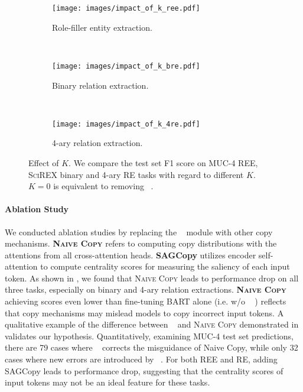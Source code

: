\documentclass[11pt]{article}
\begin{document}
\begin{figure*}[t]
    \centering
    \begin{subfigure}[t]{0.31\textwidth}

    \texttt{[image: images/impact\_of\_k\_ree.pdf]}
    \caption{Role-filler entity extraction.}
    \end{subfigure}
    ~
    \begin{subfigure}[t]{0.31\textwidth}
    \texttt{[image: images/impact\_of\_k\_bre.pdf]}
    \caption{Binary relation extraction.}
    \end{subfigure}
    ~
    \begin{subfigure}[t]{0.31\textwidth}
    \texttt{[image: images/impact\_of\_k\_4re.pdf]}
    \caption{4-ary relation extraction.}
    \end{subfigure}
    
    \caption{Effect of $K$. We compare the test set F1 score on MUC-4 REE, \textsc{SciREX} binary and 4-ary RE tasks with regard to different $K$. $K = 0$ is equivalent to removing \topkcopy~.}
    \label{fig:effect_of_k}
    \vspace{-5mm}
\end{figure*}

\paragraph{Ablation Study} We conducted ablation studies by replacing the \topkcopy~ module with other copy mechanisms. \textbf{\textsc{Naive Copy}} refers to computing copy distributions with the attentions from all cross-attention heads. \textbf{SAGCopy} \cite{xu-etal-2020-self} utilizes encoder self-attention to compute centrality scores for measuring the saliency of each input token. As shown in , we found that \textsc{Naive Copy} leads to performance drop on all three tasks, especially on binary and 4-ary relation extractions. \textbf{\textsc{Naive Copy}} achieving scores even lower than fine-tuning \textsc{BART} alone (i.e. w/o \topkcopy~ ) reflects that copy mechanisms may mislead models to copy incorrect input tokens. A qualitative example of the difference between \topkcopy~ and \textsc{Naive Copy} demonstrated in  validates our hypothesis. Quantitatively, examining MUC-4 test set predictions, there are 79 cases where \topkcopy~ corrects the misguidance of Naive Copy, while only 32 cases where new errors are introduced by \topkcopy~. For both REE and RE, adding SAGCopy leads to performance drop, suggesting that the centrality scores of input tokens may not be an ideal feature for these tasks. 
\end{document}
